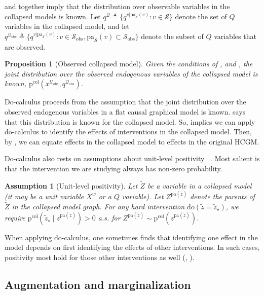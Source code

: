 \documentclass[12pt]{article}
\newtheorem{assumption}{Assumption}
\newtheorem{proposition}{Proposition}
\newcommand{\Sc}{\mathcal{S}}
\newcommand{\rmdo}{\mathrm{do}}
\newcommand{\pa}{\mathrm{pa}}
\newcommand{\pr}{\mathrm{p}}
\newcommand{\obs}{\mathrm{obs}}
\newcommand{\col}{\mathrm{col}}
\begin{document}
 and  together imply that the distribution over observable variables in the collapsed models is known. Let $q^{\mathcal{Q}} \triangleq \{q^{v | \pa_\Sc(v)}: v \in \Sc\}$ denote the set of $Q$ variables in the collapsed model, and let $q^{\mathcal{Q}_{\obs}}\triangleq \{q^{v | \pa_\Sc(v)} : v \in \mathcal{S}_{\obs}, \pa_\mathcal{S}(v) \subset \mathcal{S}_{\obs}\}$ denote the subset of $Q$ variables that are observed.
\begin{proposition}[Observed collapsed model] \label{prop:observe_collapsed}
        Given the conditions of ,  and , the joint distribution over the observed endogenous variables of the collapsed model is known, $\pr^\col(x^{\mathcal{U}_\obs},q^{\mathcal{Q}_{\obs}})$. 
\end{proposition}
\noindent Do-calculus proceeds from the assumption that the joint
distribution over the observed endogenous variables in a flat causal graphical
model is known.   says that this
distribution is known for the collapsed model.  So,
 implies we can apply do-calculus to
identify the effects of interventions in the collapsed model.  Then,
by , we can equate effects in the collapsed
model to effects in the original HCGM.

Do-calculus also rests on assumptions about unit-level positivity
~\citep{Shpitser2006-jg}.  Most salient is that the intervention we
are studying always has non-zero probability.
\begin{assumption}[Unit-level positivity] \label{assume:unit_positive}
  Let $\tilde{Z}$ be a variable in a collapsed model (it may be a unit
  variable $X^w$ or a $Q$ variable).  Let $Z^{\pa(\tilde{z})}$ denote
  the parents of $\tilde{Z}$ in the collapsed model graph.  For any
  hard intervention $\rmdo(\tilde{z} = \tilde{z}_\star)$, we require
  $\pr^\col(\tilde{z}_\star \mid z^{\pa(\tilde{z})}) > 0$ a.s. for
  $Z^{\pa(\tilde z)} \sim \pr^\col(z^{\pa(\tilde z)})$.
\end{assumption}
\noindent When applying do-calculus, one sometimes finds that identifying one effect in the model depends on first identifying the effects of other interventions. In such cases, positivity most hold for those other interventions as well (, ).

\subsection{Augmentation and marginalization}
\label{sec:augment_theory}
\end{document}
